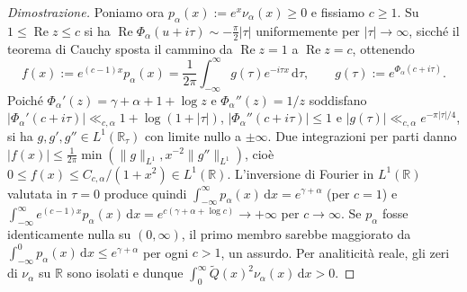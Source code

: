 \documentclass[11pt, reqno]{amsart}
\theoremstyle{remark}
\numberwithin{equation}{section}
\DeclareMathOperator{\re}{Re}
\newcommand{\R}{\mathbb{R}}
\newcommand{\dd}{\,\mathrm{d}}
\begin{document}
\begin{proof}[Dimostrazione]
Poniamo ora $p_\alpha(x) := e^x \nu_\alpha(x) \ge 0$ e fissiamo $c \ge 1$. Su $1 \le \re z \le c$ si
ha $\re\Phi_\alpha(u+i\tau) \sim -\frac{\pi}{2}|\tau|$ uniformemente per $|\tau| \to \infty$, sicché
il teorema di Cauchy sposta il cammino da $\re z = 1$ a $\re z = c$, ottenendo
\[
f(x) := e^{(c-1)x} p_\alpha(x) = \frac{1}{2\pi}\int_{-\infty}^\infty g(\tau) e^{-i\tau x}\dd\tau,
\qquad g(\tau) := e^{\Phi_\alpha(c+i\tau)}.
\]
Poiché $\Phi_\alpha'(z) = \gamma + \alpha + 1 + \log z$ e $\Phi_\alpha''(z) = 1/z$ soddisfano
$|\Phi_\alpha'(c+i\tau)| \ll_{c,\alpha} 1 + \log(1+|\tau|)$, $|\Phi_\alpha''(c+i\tau)| \le 1$ e
$|g(\tau)| \ll_{c,\alpha} e^{-\pi|\tau|/4}$, si ha $g, g', g'' \in L^1(\R_\tau)$ con limite nullo a
$\pm\infty$. Due integrazioni per parti danno $|f(x)| \le \frac{1}{2\pi}\min(\|g\|_{L^1}, x^{-2}\|g''\|_{L^1})$,
cioè $0 \le f(x) \le C_{c,\alpha}/(1+x^2) \in L^1(\R)$. L'inversione di Fourier in $L^1(\R)$ valutata
in $\tau = 0$ produce quindi $\int_{-\infty}^\infty p_\alpha(x)\dd x = e^{\gamma+\alpha}$ (per $c = 1$)
e $\int_{-\infty}^\infty e^{(c-1)x} p_\alpha(x)\dd x = e^{c(\gamma+\alpha+\log c)} \to +\infty$ per $c \to \infty$.
Se $p_\alpha$ fosse identicamente nulla su $(0,\infty)$, il primo membro sarebbe maggiorato da
$\int_{-\infty}^0 p_\alpha(x)\dd x \le e^{\gamma+\alpha}$ per ogni $c > 1$, un assurdo. Per analiticità reale,
gli zeri di $\nu_\alpha$ su $\R$ sono isolati e dunque $\int_0^\infty \widetilde{Q}(x)^2 \nu_\alpha(x)\dd x > 0$.
\end{proof}
\end{document}

